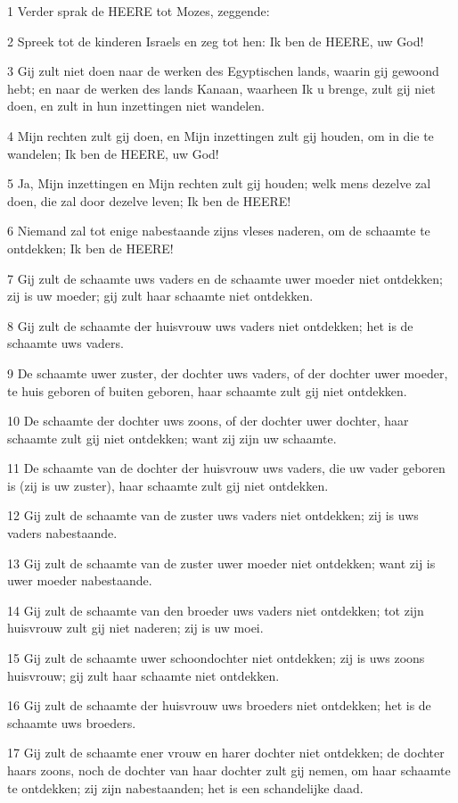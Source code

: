 \par 1 Verder sprak de HEERE tot Mozes, zeggende:
\par 2 Spreek tot de kinderen Israels en zeg tot hen: Ik ben de HEERE, uw God!
\par 3 Gij zult niet doen naar de werken des Egyptischen lands, waarin gij gewoond hebt; en naar de werken des lands Kanaan, waarheen Ik u brenge, zult gij niet doen, en zult in hun inzettingen niet wandelen.
\par 4 Mijn rechten zult gij doen, en Mijn inzettingen zult gij houden, om in die te wandelen; Ik ben de HEERE, uw God!
\par 5 Ja, Mijn inzettingen en Mijn rechten zult gij houden; welk mens dezelve zal doen, die zal door dezelve leven; Ik ben de HEERE!
\par 6 Niemand zal tot enige nabestaande zijns vleses naderen, om de schaamte te ontdekken; Ik ben de HEERE!
\par 7 Gij zult de schaamte uws vaders en de schaamte uwer moeder niet ontdekken; zij is uw moeder; gij zult haar schaamte niet ontdekken.
\par 8 Gij zult de schaamte der huisvrouw uws vaders niet ontdekken; het is de schaamte uws vaders.
\par 9 De schaamte uwer zuster, der dochter uws vaders, of der dochter uwer moeder, te huis geboren of buiten geboren, haar schaamte zult gij niet ontdekken.
\par 10 De schaamte der dochter uws zoons, of der dochter uwer dochter, haar schaamte zult gij niet ontdekken; want zij zijn uw schaamte.
\par 11 De schaamte van de dochter der huisvrouw uws vaders, die uw vader geboren is (zij is uw zuster), haar schaamte zult gij niet ontdekken.
\par 12 Gij zult de schaamte van de zuster uws vaders niet ontdekken; zij is uws vaders nabestaande.
\par 13 Gij zult de schaamte van de zuster uwer moeder niet ontdekken; want zij is uwer moeder nabestaande.
\par 14 Gij zult de schaamte van den broeder uws vaders niet ontdekken; tot zijn huisvrouw zult gij niet naderen; zij is uw moei.
\par 15 Gij zult de schaamte uwer schoondochter niet ontdekken; zij is uws zoons huisvrouw; gij zult haar schaamte niet ontdekken.
\par 16 Gij zult de schaamte der huisvrouw uws broeders niet ontdekken; het is de schaamte uws broeders.
\par 17 Gij zult de schaamte ener vrouw en harer dochter niet ontdekken; de dochter haars zoons, noch de dochter van haar dochter zult gij nemen, om haar schaamte te ontdekken; zij zijn nabestaanden; het is een schandelijke daad.
